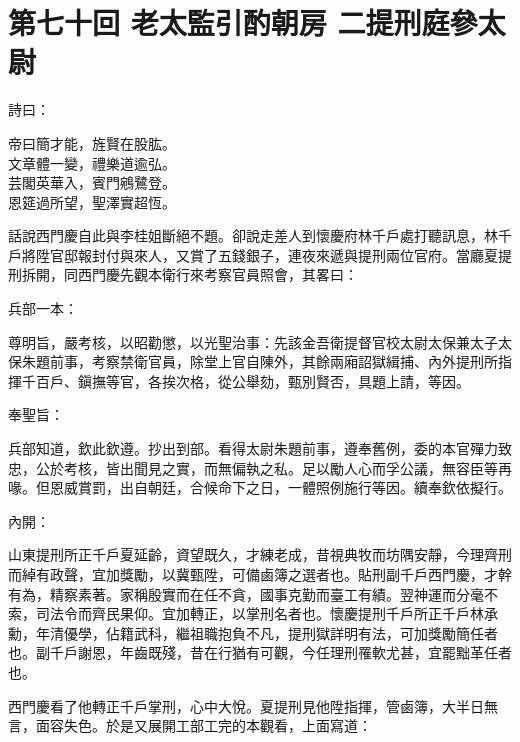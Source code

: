 
\chapter*{第七十回 老太監引酌朝房 二提刑庭參太尉}


詩曰：

\begin{myquote} 
帝曰簡才能，旌賢在股肱。\\文章體一變，禮樂道逾弘。\\芸閣英華入，賓門鵷鷺登。\\恩筵過所望，聖澤實超恆。
\end{myquote} 

話說西門慶自此與李桂姐斷絕不題。卻說走差人到懷慶府林千戶處打聽訊息，林千戶將陞官邸報封付與來人，又賞了五錢銀子，連夜來遞與提刑兩位官府。當廳夏提刑拆開，同西門慶先觀本衛行來考察官員照會，其畧曰：

\begin{myquote}[\markfont]
兵部一本：

尊明旨，嚴考核，以昭勸懲，以光聖治事：先該金吾衛提督官校太尉太保兼太子太保朱題前事，考察禁衛官員，除堂上官自陳外，其餘兩廂詔獄緝捕、內外提刑所指揮千百戶、鎭撫等官，各挨次格，從公舉劾，甄別賢否，具題上請，等因。

奉聖旨：

兵部知道，欽此欽遵。抄出到部。看得太尉朱題前事，遵奉舊例，委的本官殫力致忠，公於考核，皆出聞見之實，而無偏執之私。足以勵人心而孚公議，無容臣等再喙。但恩威賞罰，出自朝廷，合候命下之日，一體照例施行等因。續奉欽依擬行。

內開：

山東提刑所正千戶夏延齡，資望既久，才練老成，昔視典牧而坊隅安靜，今理齊刑而綽有政聲，宜加獎勵，以冀甄陞，可備鹵簿之選者也。貼刑副千戶西門慶，才幹有為，精察素著。家稱殷實而在任不貪，國事克勤而臺工有績。翌神運而分毫不索，司法令而齊民果仰。宜加轉正，以掌刑名者也。懷慶提刑千戶所正千戶林承勳，年清優學，佔籍武科，繼祖職抱負不凡，提刑獄詳明有法，可加獎勵簡任者也。副千戶謝恩，年齒既殘，昔在行猶有可觀，今任理刑罹軟尤甚，宜罷黜革任者也。
\end{myquote} 

西門慶看了他轉正千戶掌刑，心中大悅。夏提刑見他陞指揮，管鹵簿，大半日無言，面容失色。於是又展開工部工完的本觀看，上面寫道：


